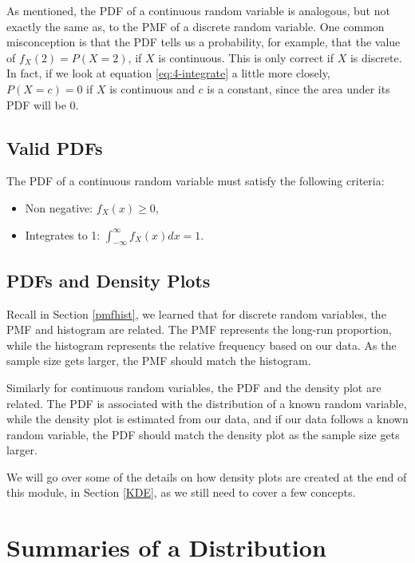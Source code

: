 \documentclass[
]{book}
\providecommand{\tightlist}{%
  \setlength{\itemsep}{0pt}\setlength{\parskip}{0pt}}
\begin{document}
As mentioned, the PDF of a continuous random variable is analogous, but not exactly the same as, to the PMF of a discrete random variable. One common misconception is that the PDF tells us a probability, for example, that the value of \(f_X(2) = P(X=2)\), if \(X\) is continuous. This is only correct if \(X\) is discrete. In fact, if we look at equation \eqref{eq:4-integrate} a little more closely, \(P(X=c) = 0\) if \(X\) is continuous and \(c\) is a constant, since the area under its PDF will be 0.

\subsection{Valid PDFs}\label{valid-pdfs}

The PDF of a continuous random variable must satisfy the following criteria:

\begin{itemize}
\tightlist
\item
  Non negative: \(f_X(x) \geq 0\),
\item
  Integrates to 1: \(\int_{-\infty}^{\infty}f_X(x) dx = 1\).
\end{itemize}

\subsection{PDFs and Density Plots}\label{pdfs-and-density-plots}

Recall in Section \ref{pmfhist}, we learned that for discrete random variables, the PMF and histogram are related. The PMF represents the long-run proportion, while the histogram represents the relative frequency based on our data. As the sample size gets larger, the PMF should match the histogram.

Similarly for continuous random variables, the PDF and the density plot are related. The PDF is associated with the distribution of a known random variable, while the density plot is estimated from our data, and if our data follows a known random variable, the PDF should match the density plot as the sample size gets larger.

We will go over some of the details on how density plots are created at the end of this module, in Section \ref{KDE}, as we still need to cover a few concepts.

\section{Summaries of a Distribution}\label{summaries-of-a-distribution}
\end{document}
